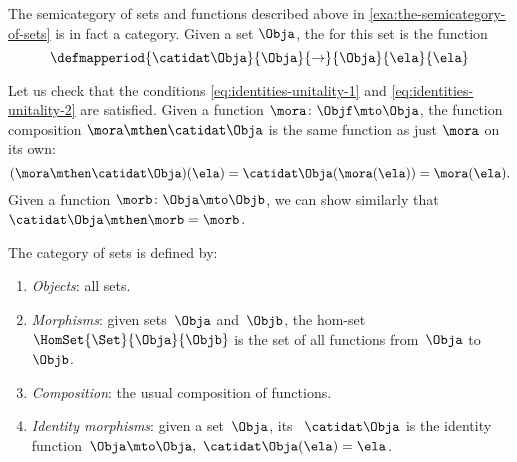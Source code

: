 
\begin{example}
    \label{exa:the-category-of-sets}
    The semicategory of sets and functions described above in \cref{exa:the-semicategory-of-sets} is in fact a category.
    Given a set $\Obja$, the  for this set is the function
    \begin{equation}
        \defmapperiod{
            \catidat\Obja
        }{
            \Obja
        }{
            \to
        }{
            \Obja
        }{
            \ela
        }{
            \ela
        }
    \end{equation}

    Let us check that the conditions \cref{eq:identities-unitality-1} and \cref{eq:identities-unitality-2} are satisfied.
    Given a function $\mora \colon \Objf \mto \Obja$, the function composition $\mora \mthen \catidat\Obja$ is the same function as just $\mora$ on its own:
    \begin{equation}
        (\mora \mthen \catidat\Obja)(\ela)
        = \catidat\Obja(\mora (\ela)) = \mora (\ela).
    \end{equation}
    Given a function $\morb \colon \Obja \mto \Objb$, we can show similarly that $\catidat\Obja \mthen \morb = \morb$.
\end{example}

\begin{ctdefinition}
    \label{def:Set}
    The category \Set of sets is defined by:
    \begin{enumerate}
        \item \emph{Objects}: all sets.
        \item \emph{Morphisms}: given sets~$\Obja$ and~$\Objb$, the hom-set~$\HomSet{\Set}{\Obja}{\Objb}$ is the set of all functions from~$\Obja$ to~$\Objb$.
        \item \emph{Composition}: the usual composition of functions.
        \item \emph{Identity morphisms}: given a set~$\Obja$, its ~$\catidat\Obja$ is the identity function~$\Obja \mto \Obja, \ \catidat\Obja(\ela) = \ela$.
    \end{enumerate}
\end{ctdefinition}

